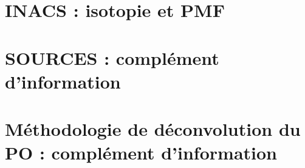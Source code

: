 \documentclass[a4paper,12pt]{book}
\begin{document}
\printbibliography


\appendix
\setcounter{table}{0}
\setcounter{figure}{0}
\setcounter{equation}{0}
\renewcommand{\thetable}{\thesection-\arabic{table}}
\renewcommand{\thefigure}{\thesection-\arabic{figure}}
\renewcommand{\theequation}{\thesection-\arabic{equation}}

\section{INACS : isotopie et PMF}%
\label{annexe:INACS}
% 

\section{SOURCES : complément d'information}
\label{annexe:SOURCES_SI}
% 

\section{Méthodologie de déconvolution du PO : complément d'information}
\label{annexe:deconvol_OP_SI}


\end{document}

